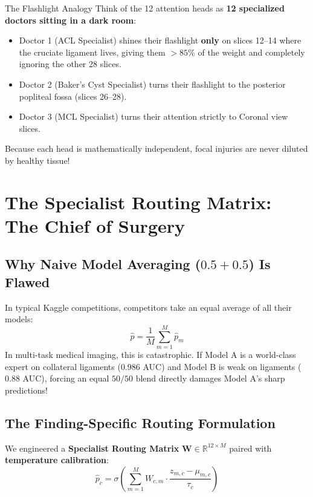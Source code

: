 \documentclass[11pt,a4paper]{article}
\begin{document}
\begin{conceptbox}{The Flashlight Analogy}
Think of the 12 attention heads as \textbf{12 specialized doctors sitting in a dark room}:
\begin{itemize}[noitemsep]
    \item Doctor 1 (ACL Specialist) shines their flashlight \textbf{only} on slices 12--14 where the cruciate ligament lives, giving them $>85\%$ of the weight and completely ignoring the other 28 slices.
    \item Doctor 2 (Baker's Cyst Specialist) turns their flashlight to the posterior popliteal fossa (slices 26--28).
    \item Doctor 3 (MCL Specialist) turns their attention strictly to Coronal view slices.
\end{itemize}
Because each head is mathematically independent, focal injuries are never diluted by healthy tissue!
\end{conceptbox}

\newpage

\section{The Specialist Routing Matrix: The Chief of Surgery}

\subsection{Why Naive Model Averaging ($0.5 + 0.5$) Is Flawed}
In typical Kaggle competitions, competitors take an equal average of all their models:
$$\hat{p} = \frac{1}{M} \sum_{m=1}^M \hat{p}_m$$
In multi-task medical imaging, this is catastrophic. If Model A is a world-class expert on collateral ligaments ($0.986$ AUC) and Model B is weak on ligaments ($0.88$ AUC), forcing an equal $50/50$ blend directly damages Model A's sharp predictions!

\subsection{The Finding-Specific Routing Formulation}
We engineered a \textbf{Specialist Routing Matrix} $\mathbf{W} \in \mathbb{R}^{12 \times M}$ paired with \textbf{temperature calibration}:
$$\hat{p}_c = \sigma\left(\sum_{m=1}^M W_{c,m} \cdot \frac{z_{m,c} - \mu_{m,c}}{\tau_c}\right)$$
\end{document}
